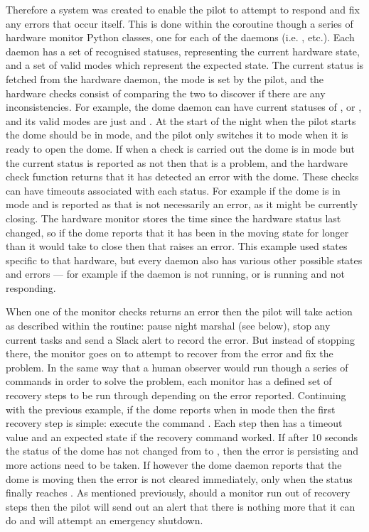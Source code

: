 \begin{colsection}
\begin{colsection}
Therefore a system was created to enable the pilot to attempt to respond and fix any errors that occur itself. This is done within the  coroutine though a series of hardware monitor Python classes, one for each of the daemons (i.e. ,  etc.). Each daemon has a set of recognised statuses, representing the current hardware state, and a set of valid modes which represent the expected state. The current status is fetched from the hardware daemon, the mode is set by the pilot, and the hardware checks consist of comparing the two to discover if there are any inconsistencies. For example, the dome daemon can have current statuses of ,  or , and its valid modes are just  and . At the start of the night when the pilot starts the dome should be in  mode, and the pilot only switches it to  mode when it is ready to open the dome. If when a check is carried out the dome is in  mode but the current status is reported as not  then that is a problem, and the hardware check function returns that it has detected an error with the dome. These checks can have timeouts associated with each status. For example if the dome is in  mode and is reported as  that is not necessarily an error, as it might be currently closing. The hardware monitor stores the time since the hardware status last changed, so if the dome reports that it has been in the moving state for longer than it would take to close then that raises an error. This example used states specific to that hardware, but every daemon also has various other possible states and errors --- for example if the daemon is not running, or is running and not responding.

When one of the monitor checks returns an error then the pilot will take action as described within the  routine: pause night marshal (see below), stop any current tasks and send a Slack alert to record the error. But instead of stopping there, the monitor goes on to attempt to recover from the error and fix the problem. In the same way that a human observer would run though a series of commands in order to solve the problem, each monitor has a defined set of recovery steps to be run through depending on the error reported. Continuing with the previous example, if the dome reports  when in  mode then the first recovery step is simple: execute the command . Each step then has a timeout value and an expected state if the recovery command worked. If after 10 seconds the status of the dome has not changed from  to , then the error is persisting and more actions need to be taken. If however the dome daemon reports that the dome is moving then the error is not cleared immediately, only when the status finally reaches . As mentioned previously, should a monitor run out of recovery steps then the pilot will send out an alert that there is nothing more that it can do and will attempt an emergency shutdown.


\end{colsection}
\end{colsection}
